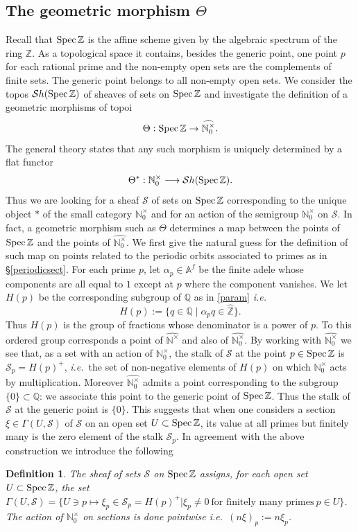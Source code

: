 \documentclass[noams,lp]{compositio}
\newtheorem{defn}[thm]{Definition} %
\def\Spec{{\rm Spec\,}}
\def\A{{\mathbb A}}
\def\N{{\mathbb N}}
\def\Q{{\mathbb Q}}
\def\Z{{\mathbb Z}}
\def\cS{{\mathcal S}}
\newcommand{\ie}{{\it i.e.\/}\ }
\def\spz{{\Spec\Z}}
\def\wnt{{\widehat{\N^{\times}}}}
\def\nto{\N_0^{\times}}
\def\wnto{{\widehat{\nto}}}
\begin{document}
\subsection{The geometric morphism $\Theta$}\label{sectspz}

Recall that $\Spec\Z$ is the affine scheme given by the algebraic spectrum of the ring $\Z$. As a  topological space it  contains, besides the generic point,  one point $p$ for each rational prime and the non-empty open sets are the complements of finite sets. The generic point belongs to all non-empty open sets. We consider the topos $ {\mathcal Sh}(\Spec\Z)$ of sheaves of sets on $\Spec\Z$ and investigate the definition of a geometric morphisms of topoi
$$
\Theta: \Spec\Z\to \wnto.
$$
The general theory states that any such morphism is uniquely determined by a flat functor 
$$
\Theta^*: \nto \longrightarrow {\mathcal Sh}(\Spec\Z).
$$
 Thus we are looking for a sheaf $\cS$ of sets on $\Spec\Z$ corresponding to the unique object $\ast$ of the small category $\nto$ and for an action of the semigroup $\nto$ on $\cS$. In fact, a geometric morphism such as $\Theta$ determines a map  between the points of $\Spec\Z$ and the points of $\wnto$.  We first give the natural guess for the definition of such map on points related to the periodic orbits associated to primes as in \S \ref{periodicsect}. For each prime $p$,  let $\alpha_p\in\A^f$  be the finite adele  whose components are all equal to $1$ except at $p$ where the component vanishes. We let $H(p)$ be the corresponding subgroup of $\Q$ as in \eqref{param} \ie
$$
H(p):=\{q\in \Q\mid \alpha_p q\in \hat\Z\}.
$$
Thus $H(p)$ is the group of fractions whose denominator is a power of $p$. To this ordered group  corresponds a point of $\wnt$ and also of $\wnto$. By working with $\wnto$ we see that, as a set with an action of $\nto$, the stalk of $\cS$ at the point $p\in \Spec\Z$ is $\cS_p=H(p)^+$, \ie the set of non-negative elements of $H(p)$ on which  $\nto$ acts by multiplication. Moreover $\wnto$ admits a point corresponding to the subgroup $\{0\}\subset \Q$: we associate this point to the generic point of $\Spec\Z$. Thus the stalk of $\cS$ at the generic point is $\{0\}$. This suggests that when one considers a section $\xi\in\Gamma(U,\cS)$ of  $\cS$ on an open set $U\subset\Spec\Z$, its value at all primes but finitely many is the zero element of the stalk $\cS_p$. \newline
In agreement with the above construction we introduce the following

\begin{defn} The sheaf of sets $\cS$ on $\spz$ assigns, for each open set $U\subset\Spec\Z$, the set $\Gamma(U,\cS)=\{U\ni p\mapsto \xi_p\in \cS_p=H(p)^+\vert\xi_p\neq 0~ \text{for finitely many primes} ~p\in U\}$. The action of $\nto$ on sections is done pointwise \ie $(n\xi)_p:=n\xi_p$.
\end{defn}
\end{document}
